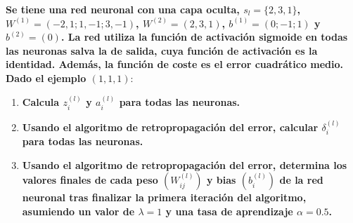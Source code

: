 \textbf{Se tiene una red neuronal con una capa oculta, $s_l = \{2, 3, 1\}$, $W^{(1)} = (-2, 1; 1, -1; 3, -1)$, $W^{(2)} = (2, 3, 1)$, $b^{(1)} = (0; -1; 1)$ y $b^{(2)} = (0)$. La red utiliza la función de activación sigmoide en todas las neuronas salva la de salida, cuya función de activación es la identidad. Además, la función de coste es el error cuadrático medio. Dado el ejemplo $(1, 1, 1):$}
\begin{enumerate}
    \item \textbf{Calcula $z_i^{(l)}$ y $a_i^{(l)}$ para todas las neuronas.}
    \item \textbf{Usando el algoritmo de retropropagación del error, calcular $\delta_i^{(l)}$ para todas las neuronas.}
    \item \textbf{Usando el algoritmo de retropropagación del error, determina los valores finales de cada peso $(W_{ij}^{(l)})$ y bias $(b_i^{(l)})$ de la red neuronal tras finalizar la primera iteración del algoritmo, asumiendo un valor de $\lambda = 1$ y una tasa de aprendizaje $\alpha = 0.5$.}
\end{enumerate}

